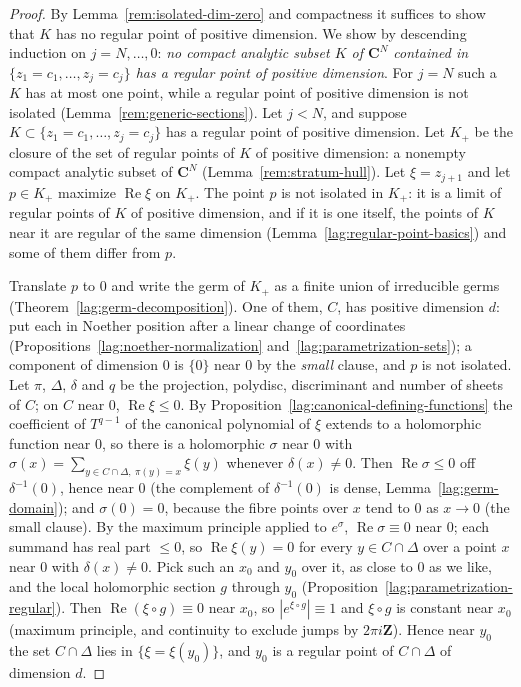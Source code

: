 \begin{proof}
\leanok
By Lemma~\ref{rem:isolated-dim-zero} and compactness it suffices to show that \(K\) has no regular point of positive dimension. We show by descending induction on
\(j=N,\dots,0\): \emph{no compact analytic subset \(K\) of \(\mathbf C^N\) contained in \(\{z_1=c_1,\dots,z_j=c_j\}\) has a regular point of positive
dimension}. For \(j=N\) such a \(K\) has at most one point, while a regular point of positive dimension is not isolated (Lemma~\ref{rem:generic-sections}). Let
\(j<N\), and suppose \(K\subset\{z_1=c_1,\dots,z_j=c_j\}\) has a regular point of positive dimension. Let \(K_+\) be the closure of the set of regular points of \(K\)
of positive dimension: a nonempty compact analytic subset of \(\mathbf C^N\) (Lemma~\ref{rem:stratum-hull}). Let \(\xi=z_{j+1}\) and let \(p\in K_+\) maximize
\(\operatorname{Re}\xi\) on \(K_+\). The point \(p\) is not isolated in \(K_+\): it is a limit of regular points of \(K\) of positive dimension, and if it is one itself,
the points of \(K\) near it are regular of the same dimension (Lemma~\ref{lag:regular-point-basics}) and some of them differ from \(p\).

Translate \(p\) to \(0\) and write the germ of \(K_+\) as a finite union of irreducible germs (Theorem~\ref{lag:germ-decomposition}). One of them, \(C\), has positive
dimension \(d\): put each in Noether position after a linear change of coordinates (Propositions~\ref{lag:noether-normalization} and~\ref{lag:parametrization-sets}); a
component of dimension \(0\) is \(\{0\}\) near \(0\) by the \emph{small} clause, and \(p\) is not isolated. Let \(\pi\), \(\Delta\), \(\delta\) and \(q\) be the projection,
polydisc, discriminant and number of sheets of \(C\); on \(C\) near \(0\), \(\operatorname{Re}\xi\le0\). By Proposition~\ref{lag:canonical-defining-functions} the
coefficient of \(T^{q-1}\) of the canonical polynomial of \(\xi\) extends to a holomorphic function near \(0\), so there is a holomorphic \(\sigma\) near \(0\) with
\(\sigma(x)=\sum_{y\in C\cap\Delta,\ \pi(y)=x}\xi(y)\) whenever \(\delta(x)\ne0\). Then \(\operatorname{Re}\sigma\le0\) off \(\delta^{-1}(0)\), hence near \(0\) (the complement of
\(\delta^{-1}(0)\) is dense, Lemma~\ref{lag:germ-domain}); and \(\sigma(0)=0\), because the fibre points over \(x\) tend to \(0\) as \(x\to0\) (the small clause). By the maximum
principle applied to \(e^{\sigma}\), \(\operatorname{Re}\sigma\equiv0\) near \(0\); each summand has real part \(\le0\), so \(\operatorname{Re}\xi(y)=0\) for every \(y\in C\cap\Delta\)
over a point \(x\) near \(0\) with \(\delta(x)\ne0\). Pick such an \(x_0\) and \(y_0\) over it, as close to \(0\) as we like, and the local holomorphic section \(g\) through
\(y_0\) (Proposition~\ref{lag:parametrization-regular}). Then \(\operatorname{Re}(\xi\circ g)\equiv0\) near \(x_0\), so \(|e^{\xi\circ g}|\equiv1\) and \(\xi\circ g\) is constant
near \(x_0\) (maximum principle, and continuity to exclude jumps by \(2\pi i\mathbf Z\)). Hence near \(y_0\) the set \(C\cap\Delta\) lies in \(\{\xi=\xi(y_0)\}\), and \(y_0\) is a
regular point of \(C\cap\Delta\) of dimension \(d\).


\end{proof}
